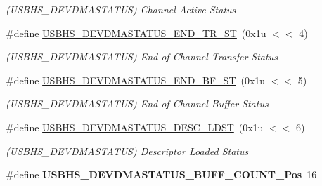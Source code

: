 \begin{DoxyCompactItemize}
\begin{DoxyCompactList}\small\item\em (U\+S\+B\+H\+S\+\_\+\+D\+E\+V\+D\+M\+A\+S\+T\+A\+T\+US) Channel Active Status \end{DoxyCompactList}\item 
\mbox{\label{group__SAME70__USBHS_ga425d05279c0c14944268728e346015b0}} 
\#define \mbox{\hyperlink{group__SAME70__USBHS_ga425d05279c0c14944268728e346015b0}{U\+S\+B\+H\+S\+\_\+\+D\+E\+V\+D\+M\+A\+S\+T\+A\+T\+U\+S\+\_\+\+E\+N\+D\+\_\+\+T\+R\+\_\+\+ST}}~(0x1u $<$$<$ 4)
\begin{DoxyCompactList}\small\item\em (U\+S\+B\+H\+S\+\_\+\+D\+E\+V\+D\+M\+A\+S\+T\+A\+T\+US) End of Channel Transfer Status \end{DoxyCompactList}\item 
\mbox{\label{group__SAME70__USBHS_ga132996c11225849c258ce9718acb6ac9}} 
\#define \mbox{\hyperlink{group__SAME70__USBHS_ga132996c11225849c258ce9718acb6ac9}{U\+S\+B\+H\+S\+\_\+\+D\+E\+V\+D\+M\+A\+S\+T\+A\+T\+U\+S\+\_\+\+E\+N\+D\+\_\+\+B\+F\+\_\+\+ST}}~(0x1u $<$$<$ 5)
\begin{DoxyCompactList}\small\item\em (U\+S\+B\+H\+S\+\_\+\+D\+E\+V\+D\+M\+A\+S\+T\+A\+T\+US) End of Channel Buffer Status \end{DoxyCompactList}\item 
\mbox{\label{group__SAME70__USBHS_ga35b0093e492bed9ea99e21a1cbd3d2ad}} 
\#define \mbox{\hyperlink{group__SAME70__USBHS_ga35b0093e492bed9ea99e21a1cbd3d2ad}{U\+S\+B\+H\+S\+\_\+\+D\+E\+V\+D\+M\+A\+S\+T\+A\+T\+U\+S\+\_\+\+D\+E\+S\+C\+\_\+\+L\+D\+ST}}~(0x1u $<$$<$ 6)
\begin{DoxyCompactList}\small\item\em (U\+S\+B\+H\+S\+\_\+\+D\+E\+V\+D\+M\+A\+S\+T\+A\+T\+US) Descriptor Loaded Status \end{DoxyCompactList}\item 
\mbox{\label{group__SAME70__USBHS_ga988543f1a187b28d82e02a88465a023b}} 
\#define {\bfseries U\+S\+B\+H\+S\+\_\+\+D\+E\+V\+D\+M\+A\+S\+T\+A\+T\+U\+S\+\_\+\+B\+U\+F\+F\+\_\+\+C\+O\+U\+N\+T\+\_\+\+Pos}~16
\item 
\mbox{\label{group__SAME70__USBHS_ga6441367716baec1f6e76bb93f74fde59}} 
$$
\end{DoxyCompactItemize}
